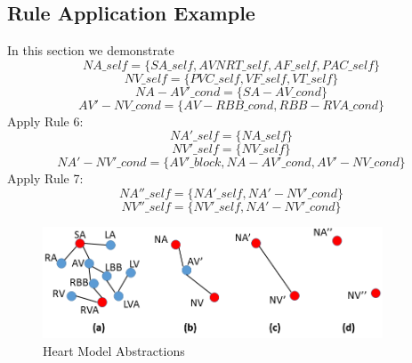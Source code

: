 \subsection{Rule Application Example}
In this section we demonstrate 
$$NA\_self=\{SA\_self,AVNRT\_self,AF\_self,PAC\_self\}$$
$$NV\_self=\{PVC\_self,VF\_self,VT\_self\}$$
$$NA-AV'\_cond=\{SA-AV\_cond\}$$
$$AV'-NV\_cond=\{AV-RBB\_cond,RBB-RVA\_cond\}$$
Apply Rule 6:
$$NA'\_self=\{NA\_self\}$$
$$NV'\_self=\{NV\_self\}$$
$$NA'-NV'\_cond=\{AV'\_block,NA-AV'\_cond,AV'-NV\_cond\}$$
Apply Rule 7:
$$NA''\_self=\{NA'\_self,NA'-NV'\_cond\}$$
$$NV''\_self=\{NV'\_self,NA'-NV'\_cond\}$$
\begin{figure}[!t]
		\centering
		\includegraphics[width=0.9\textwidth]{figs/abs.png}
		\caption{\small Heart Model Abstractions}
		\label{fig:abs_exam}
\end{figure}







